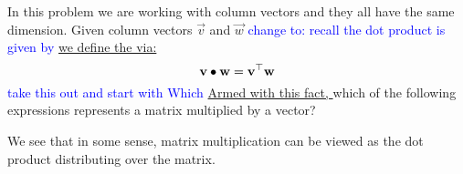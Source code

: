 \documentclass{ximera}
\author{Bart Snapp}
\begin{document}
\begin{exercise}
  In this problem we are working with column vectors and they all have
  the same dimension. Given column vectors $\vec{v}$ and $\vec{w}$ \textcolor{blue}{change to: recall the dot product is given by} \underline{we
  define the  via:}
  \[
  \mathbf{v}\bullet \mathbf{w} = \mathbf{v}^\top \mathbf{w}
  \]
  \textcolor{blue}{take this out and start with Which} \underline{Armed with this fact, }which of the following expressions represents
  a matrix multiplied by a vector?
  \begin{multipleChoice}
  \end{multipleChoice}
  \begin{feedback}[correct]
    We see that in some sense, matrix multiplication can be viewed as
    the dot product distributing over the matrix.
  \end{feedback}
\end{exercise}
\end{document}
